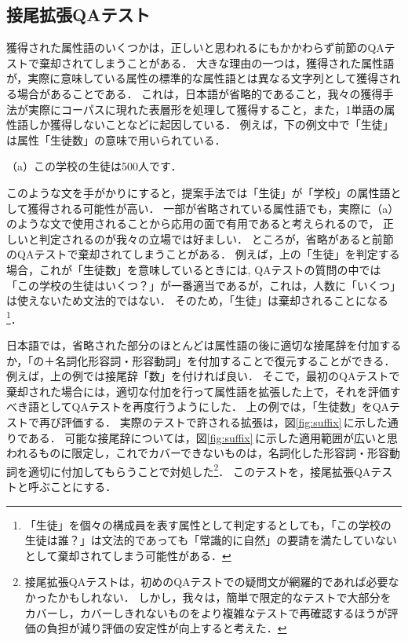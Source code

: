 \subsection{接尾拡張QAテスト}
\label{sec:qa-suffix-test}
獲得された属性語のいくつかは，正しいと思われるにもかかわらず前節のQAテストで棄却されてしまうことがある．
大きな理由の一つは，獲得された属性語が，実際に意味している属性の標準的な属性語とは異なる文字列として獲得される場合があることである．
これは，日本語が省略的であること，我々の獲得手法が実際にコーパスに現れた表層形を処理して獲得すること，また，1単語の属性語しか獲得しないことなどに起因している．
例えば，下の例文中で「生徒」は属性「生徒数」の意味で用いられている．
\begin{center}
（a）この学校の生徒は500人です．
\end{center}
このような文を手がかりにすると，提案手法では「生徒」が「学校」の属性語として獲得される可能性が高い．
一部が省略されている属性語でも，実際に（a）のような文で使用されることから応用の面で有用であると考えられるので，
正しいと判定されるのが我々の立場では好ましい．
ところが，省略があると前節のQAテストで棄却されてしまうことがある．
例えば，上の「生徒」を判定する場合，これが「生徒数」を意味しているときには,
QAテストの質問の中では「この学校の生徒はいくつ？」が一番適当であるが，これは，人数に「いくつ」は使えないため文法的ではない．
そのため，「生徒」は棄却されることになる\footnote{「生徒」を個々の構成員を表す属性として判定するとしても，「この学校の生徒は誰？」は文法的であっても「常識的に自然」の要請を満たしていないとして棄却されてしまう可能性がある．}．

日本語では，省略された部分のほとんどは属性語の後に適切な接尾辞を付加するか，「の＋名詞化形容詞・形容動詞」を付加することで復元することができる．
例えば，上の例では接尾辞「数」を付ければ良い． 
そこで，最初のQAテストで棄却された場合には，適切な付加を行って属性語を拡張した上で，それを評価すべき語としてQAテストを再度行うようにした．
上の例では，「生徒数」をQAテストで再び評価する．
実際のテストで許される拡張は，図\ref{fig:suffix}\,に示した通りである．
可能な接尾辞については，図\ref{fig:suffix}\,に示した適用範囲が広いと思われるものに限定し，これでカバーできないものは，名詞化した形容詞・形容動詞を適切に付加してもらうことで対処した\footnote{接尾拡張QAテストは，初めのQAテストでの疑問文が網羅的であれば必要なかったかもしれない． しかし，我々は，簡単で限定的なテストで大部分をカバーし，カバーしきれないものをより複雑なテストで再確認するほうが評価の負担が減り評価の安定性が向上すると考えた．}．
このテストを，接尾拡張QAテストと呼ぶことにする．

